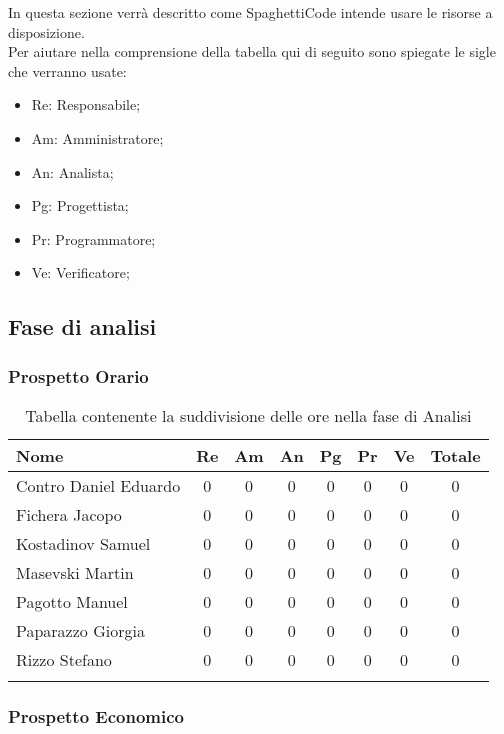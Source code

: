 \documentclass[../piano_di_progetto.tex]{subfiles}
\begin{document}
In questa sezione verrà descritto come SpaghettiCode intende usare le risorse a disposizione. \\
Per aiutare nella comprensione della tabella qui di seguito sono spiegate le sigle che verranno usate:
\begin{itemize}
\item Re: Responsabile;
\item Am: Amministratore;
\item An: Analista;
\item Pg: Progettista;
\item Pr: Programmatore;
\item Ve: Verificatore;
\end{itemize}


\subsection{ Fase di analisi}%
\label{sub:fase_analisi}
\subsubsection{Prospetto Orario}

\begin{center}
	\begin{longtable}{|l|c|c|c|c|c|c|c|}
		\hline
		\rowcolor{lightgray}
		\textbf{Nome} & \textbf{Re} & \textbf{Am} & \textbf{An} & \textbf{Pg}  & \textbf{Pr}   & \textbf{Ve} & \textbf{Totale} \\

		\hline
			Contro Daniel Eduardo & 0 &0&0&0&0&0 & 0 \\
		\hline
			Fichera Jacopo &  0 &0&0&0&0&0 & 0 \\
		\hline
			Kostadinov Samuel &  0 &0&0&0&0&0 & 0 \\			
		\hline
			Masevski Martin 	&  0 &0&0&0&0&0 & 0\\
		\hline
			Pagotto Manuel &  0 &0&0&0&0&0 & 0 \\			
		\hline
			Paparazzo Giorgia &  0 &0&0&0&0&0 & 0 \\
		\hline
			Rizzo Stefano &  0 &0&0&0&0&0 & 0\\
		\hline	

		\caption{Tabella contenente la suddivisione delle ore nella fase di Analisi}
	\end{longtable}
\end{center}

\subsubsection{Prospetto Economico}
\end{document}
